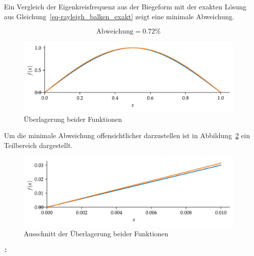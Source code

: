 \documentclass[
  letterpaper,
  DIV=11]{scrreprt}
\begin{document}
Ein Vergleich der Eigenkreisfrequenz aus der Biegeform mit der exakten
Lösung aus Gleichung~\ref{eq-rayleigh_balken_exakt} zeigt eine minimale
Abweichung.

\begin{equation}\text{Abweichung} = 0.72 \%\end{equation}

\begin{figure}[H]

{\centering \includegraphics{index_files/mediabag/rayleigh_03_files/figure-pdf/fig-formfunktion_vergleich-output-1.pdf}

}

\caption{\label{fig-formfunktion_vergleich}Überlagerung beider
Funktionen}

\end{figure}

Um die minimale Abweichung offensichtlicher darzustellen ist in
Abbildung~\ref{fig-ausschnitt_formfunktion_vergleich} ein Teilbereich
dargestellt.

\begin{figure}[H]

{\centering \includegraphics{index_files/mediabag/rayleigh_03_files/figure-pdf/fig-ausschnitt_formfunktion_vergleich-output-1.pdf}

}

\caption{\label{fig-ausschnitt_formfunktion_vergleich}Ausschnitt der
Überlagerung beider Funktionen}

\end{figure}

\begin{verbatim}
: 
\end{verbatim}
\end{document}
